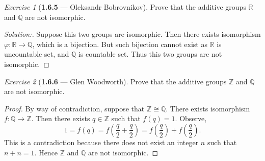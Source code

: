 \documentclass[12pt]{amsart}
\theoremstyle{remark}
\newtheorem*{exercise}{Exercise}%
\newcommand{\RR}{{\mathbb R}}
\newcommand{\ZZ}{{\mathbb Z}}
\newcommand{\QQ}{{\mathbb Q}}
\theoremstyle{mycomment}
\begin{document}
\begin{exercise}[\textbf{1.6.5} --- Oleksandr Bobrovnikov]
  Prove that the additive groups $\RR$ and $\QQ$ are not isomorphic.
  \begin{proof}[Solution:]
    Suppose this two groups are isomorphic. Then there exists isomorphism $\varphi:\RR\to\QQ$, which is a bijection. But such bijection cannot exist as $\RR$ is uncountable set, and $\QQ$ is countable set. Thus this two groups are not isomorphic.
  \end{proof}
\end{exercise}
\vspace{.15in}



\begin{exercise}[\textbf{1.6.6} --- Glen Woodworth] Prove that the additive groups $\ZZ$ and $\QQ$ are not isomorphic. 
  \begin{proof}
  By way of contradiction, suppose that $\ZZ\cong\QQ$. There exists isomorphism $f:\QQ\rightarrow\ZZ$. Then there exists $q\in\ZZ$ such that $f(q)=1$. Observe,
  \[1=f(q)=f\left(\frac{q}{2}+\frac{q}{2}\right)=f\left(\frac{q}{2}\right)+f\left(\frac{q}{2}\right).\]
  This is a contradiction because there does not exist an integer $n$ such that $n+n=1$. Hence $\ZZ$ and $\QQ$ are not isomorphic.
  \end{proof} 
  \end{exercise}
\vspace{.15in}
\end{document}
